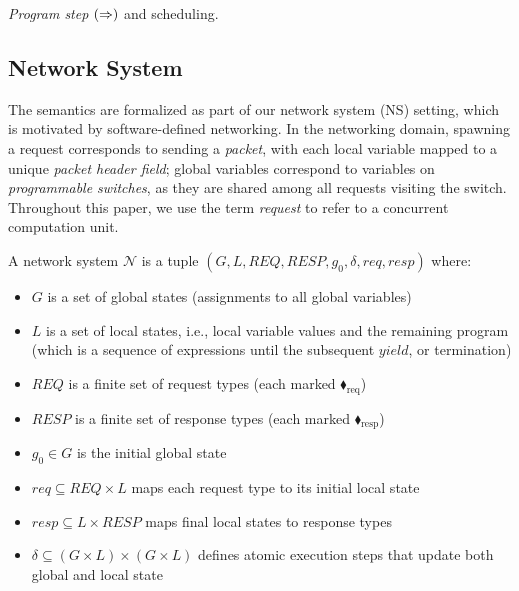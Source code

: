 \noindent\textit{Program step} $(\mathrel{\Rightarrow})$ and scheduling.


   
    
    
\subsection{Network System}    
    
The semantics are formalized as part of our network system (NS) setting, which is motivated by software-defined networking. In the networking domain, spawning a request corresponds to sending a \textit{packet}, with each local variable mapped to a unique \textit{packet header field}; global variables correspond to variables on \textit{programmable switches}, as they are shared among all requests visiting the switch. Throughout this paper, we use the term \emph{request} to refer to a concurrent computation unit. 
    
   
A network system $\mathcal{N}$ is a tuple $(G, L, \mathit{REQ}, \mathit{RESP}, g_0, \delta, \mathit{req}, \mathit{resp})$ where:
\begin{itemize}
\item $G$ is a set of global states (assignments to all global variables)
\item $L$ is a set of local states, i.e., local variable values and the remaining program (which is a sequence of expressions until the subsequent \(\mathit{yield}\), or termination)
\item $\mathit{REQ}$ is a finite set of request types (each marked {\color{ForestGreen}$\blacklozenge_\text{req}$})
\item $\mathit{RESP}$ is a finite set of response types (each marked {\color{red}$\blacklozenge_\text{resp}$})
\item $g_0 \in G$ is the initial global state
\item $\mathit{req} \subseteq \mathit{REQ} \times L$ maps each request type to its initial local state
\item $\mathit{resp} \subseteq L \times \mathit{RESP}$ maps final local states to response types
\item $\delta \subseteq (G \times L) \times (G \times L)$ defines atomic execution steps that update both global and local state
\end{itemize}

